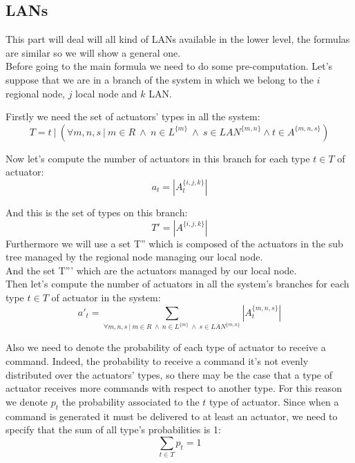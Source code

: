 \documentclass[11pt]{article}
\begin{document}


\subsection{LANs}
This part will deal will all kind of LANs available in the lower level, the formulas are similar so we will show a general one.\\
Before going to the main formula we need to do some pre-computation.
Let's suppose that we are in a branch of the system in which we belong to the $i$ regional node, $j$ local node and $k$ LAN.

Firstly we need the set of actuators' types in all the system:
\begin{equation}
    T = t \ | \ (\forall m,n,s \ | \ m \in R \ \land \ n \in L^{\{m\}} \ \land \ s \in LAN^{\{m, n\}} \land t \in A^{\{m,n,s\}})
\end{equation}

Now let's compute the number of actuators in this branch for each type $t \in T$ of actuator:
\begin{equation}
    a_{t} = | A^{\{i, j, k\}}_{t} |
\end{equation}

And this is the set of types on this branch:
\begin{equation}
    T' = | A^{\{i, j, k\}} |
\end{equation}
Furthermore we will use a set T'' which is composed of the actuators in the sub tree managed by the regional node managing our local node.\\
And the set T''' which are the actuators managed by our local node.\\


Then let's compute the number of actuators in all the system's branches for each type $t \in T$ of actuator in the system:
\begin{equation}
    a'_{t} = \sum_{\forall m,n,s \ | \ m \in R \ \land \ n \in L^{\{m\}} \ \land \ s \in LAN^{\{m, n\}}}{ |A^{\{m, n, s\}}_{t}| }
\end{equation}


Also we need to denote the probability of each type of actuator to receive a command. Indeed, the probability to receive a command it's not evenly distributed over the actuators' types, so there may be the case that a type of actuator receives more commands with respect to another type.
For this reason we denote $p_t$ the probability associated to the $t$ type of actuator.
Since when a command is generated it must be delivered to at least an actuator, we need to specify that the sum of all type's probabilities is 1:
\begin{equation}
    \sum_{t \in T}{p_t} = 1
\end{equation}
\end{document}

